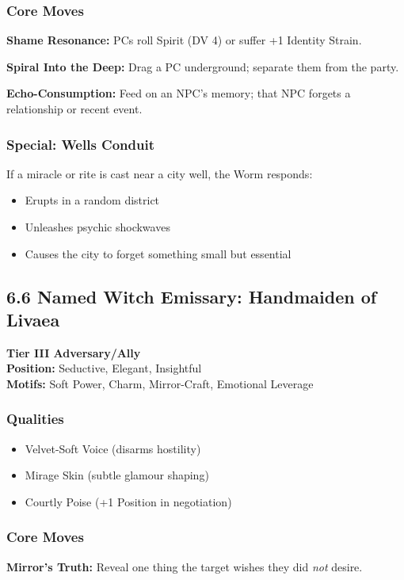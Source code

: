 \documentclass[11pt]{book}
\begin{document}
\subsubsection*{Core Moves}
\textbf{Shame Resonance:} PCs roll Spirit (DV 4) or suffer +1 Identity Strain.

\textbf{Spiral Into the Deep:} Drag a PC underground; separate them from the party.

\textbf{Echo-Consumption:} Feed on an NPC's memory; that NPC forgets a relationship or recent event.

\subsubsection*{Special: Wells Conduit}
If a miracle or rite is cast near a city well, the Worm responds:
\begin{itemize}[leftmargin=*]
    \item Erupts in a random district
    \item Unleashes psychic shockwaves
    \item Causes the city to forget something small but essential
\end{itemize}

\subsection{6.6 Named Witch Emissary: Handmaiden of Livaea}

\textbf{Tier III Adversary/Ally} \\
\textbf{Position:} Seductive, Elegant, Insightful \\
\textbf{Motifs:} Soft Power, Charm, Mirror-Craft, Emotional Leverage

\subsubsection*{Qualities}
\begin{itemize}[leftmargin=*]
    \item Velvet-Soft Voice (disarms hostility)
    \item Mirage Skin (subtle glamour shaping)
    \item Courtly Poise (+1 Position in negotiation)
\end{itemize}

\subsubsection*{Core Moves}
\textbf{Mirror's Truth:} Reveal one thing the target wishes they did \emph{not} desire.
\end{document}
